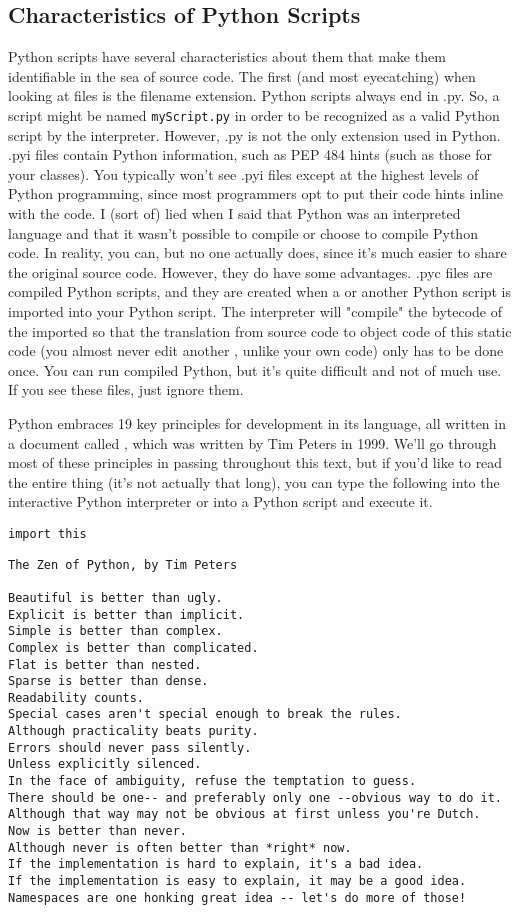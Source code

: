 \subsection{Characteristics of Python Scripts}
Python scripts have several characteristics about them that make them identifiable in the sea of source code. The first (and most eyecatching) when looking at files is the filename extension. Python scripts always end in .py. So, a script might be named \verb|myScript.py| in order to be recognized as a valid Python script by the interpreter. However, .py is not the only extension used in Python. .pyi files contain Python information, such as PEP 484 hints (such as those for your classes). You typically won't see .pyi files except at the highest levels of Python programming, since most programmers opt to put their code hints inline with the code.
I (sort of) lied when I said that Python was an interpreted language and that it wasn't possible to compile or choose to compile Python code. In reality, you can, but no one actually does, since it's much easier to share the original source code. However, they do have some advantages. .pyc files are compiled Python scripts, and they are created when a  or another Python script is imported into your Python script. The interpreter will "compile" the bytecode of the imported  so that the translation from source code to object code of this static code (you almost never edit another , unlike your own code) only has to be done once. You can run compiled Python, but it's quite difficult and not of much use. If you see these files, just ignore them.\par
Python embraces 19 key principles for development in its language, all written in a document called , which was written by Tim Peters in 1999. We'll go through most of these principles in passing throughout this text, but if you'd like to read the entire thing (it's not actually that long), you can type the following into the interactive Python interpreter or into a Python script and execute it.
\begin{lstlisting}[style=pippython]
import this
\end{lstlisting}
\begin{lstlisting}[style=none]
The Zen of Python, by Tim Peters

Beautiful is better than ugly.
Explicit is better than implicit.
Simple is better than complex.
Complex is better than complicated.
Flat is better than nested.
Sparse is better than dense.
Readability counts.
Special cases aren't special enough to break the rules.
Although practicality beats purity.
Errors should never pass silently.
Unless explicitly silenced.
In the face of ambiguity, refuse the temptation to guess.
There should be one-- and preferably only one --obvious way to do it.
Although that way may not be obvious at first unless you're Dutch.
Now is better than never.
Although never is often better than *right* now.
If the implementation is hard to explain, it's a bad idea.
If the implementation is easy to explain, it may be a good idea.
Namespaces are one honking great idea -- let's do more of those!
\end{lstlisting}
